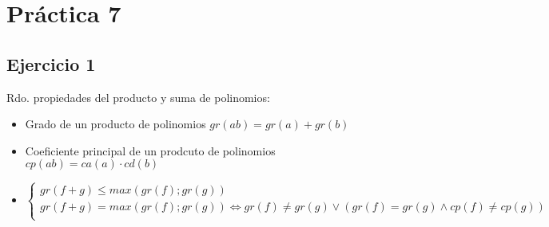 
\usepackage{caratula}
\usepackage{enumerate}
\usepackage{hyperref}
\usepackage{graphicx}
\usepackage{amsfonts}
\usepackage{enumitem}
\usepackage{amsmath}

\decimalpoint
\hypersetup{colorlinks=true, linkcolor=black, urlcolor=blue}
\setlength{\parindent}{0em}
\setlength{\parskip}{0.5em}
\setcounter{tocdepth}{2} %
\setcounter{section}{6} %
\renewcommand{\thesubsubsection}{\thesubsection.\Alph{subsubsection}}
\graphicspath{ {images/} }

\newcommand\eqHI{\mathrel{\overset{\makebox[0pt]{\mbox{\normalfont\tiny\sffamily HI}}}{=}}}





\maketitle
\newpage

\tableofcontents
\newpage

\section{Práctica 7}

\subsection{Ejercicio 1}

Rdo. propiedades del producto y suma de polinomios: 
\begin{itemize}
    \item Grado de un producto de polinomios $ gr(ab) = gr(a) + gr(b) $
    \item Coeficiente principal de un prodcuto de polinomios $ cp(ab) = ca(a)\cdot cd(b) $
    \item $ \begin{cases}
        gr(f+g) \leq max(gr(f); gr(g)) \\
        gr(f+g) = max(gr(f); gr(g)) \iff gr(f) \neq gr(g) \vee (gr(f) = gr(g) \wedge cp(f) \neq cp(g))\\
    \end{cases}  $
\end{itemize}


